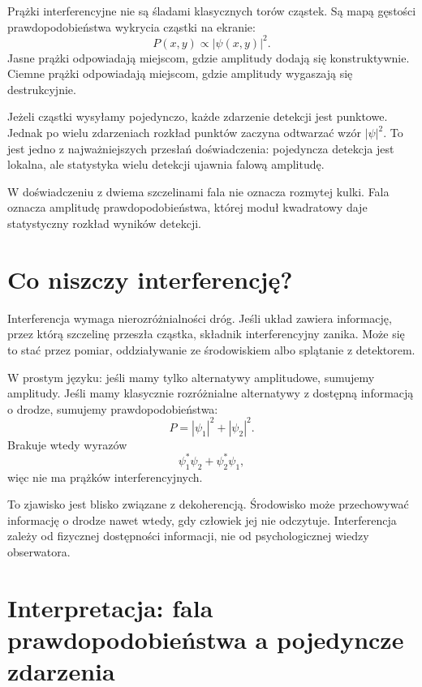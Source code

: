 Prążki interferencyjne nie są śladami klasycznych torów cząstek. Są mapą gęstości prawdopodobieństwa wykrycia cząstki na ekranie:
\begin{equation}
    P(x,y)\propto |\psi(x,y)|^2.
\end{equation}
Jasne prążki odpowiadają miejscom, gdzie amplitudy dodają się konstruktywnie. Ciemne prążki odpowiadają miejscom, gdzie amplitudy wygaszają się destrukcyjnie.

Jeżeli cząstki wysyłamy pojedynczo, każde zdarzenie detekcji jest punktowe. Jednak po wielu zdarzeniach rozkład punktów zaczyna odtwarzać wzór \(|\psi|^2\). To jest jedno z najważniejszych przesłań doświadczenia: pojedyncza detekcja jest lokalna, ale statystyka wielu detekcji ujawnia falową amplitudę.

\begin{summarybox}
W doświadczeniu z dwiema szczelinami fala nie oznacza rozmytej kulki. Fala oznacza amplitudę prawdopodobieństwa, której moduł kwadratowy daje statystyczny rozkład wyników detekcji.
\end{summarybox}

\section{Co niszczy interferencję?}

Interferencja wymaga nierozróżnialności dróg. Jeśli układ zawiera informację, przez którą szczelinę przeszła cząstka, składnik interferencyjny zanika. Może się to stać przez pomiar, oddziaływanie ze środowiskiem albo splątanie z detektorem.

W prostym języku: jeśli mamy tylko alternatywy amplitudowe, sumujemy amplitudy. Jeśli mamy klasycznie rozróżnialne alternatywy z dostępną informacją o drodze, sumujemy prawdopodobieństwa:
\begin{equation}
    P=|\psi_1|^2+|\psi_2|^2.
\end{equation}
Brakuje wtedy wyrazów
\begin{equation}
    \psi_1^*\psi_2+\psi_2^*\psi_1,
\end{equation}
więc nie ma prążków interferencyjnych.

To zjawisko jest blisko związane z dekoherencją. Środowisko może przechowywać informację o drodze nawet wtedy, gdy człowiek jej nie odczytuje. Interferencja zależy od fizycznej dostępności informacji, nie od psychologicznej wiedzy obserwatora.

\section{Interpretacja: fala prawdopodobieństwa a pojedyncze zdarzenia}

